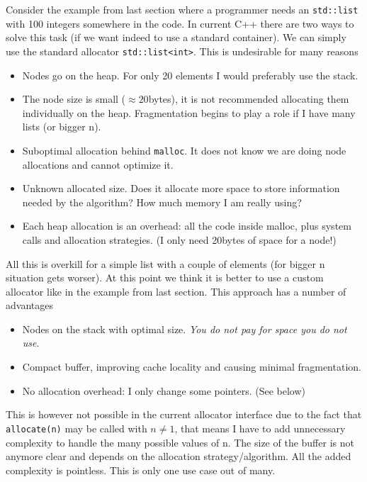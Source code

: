 \documentclass[11pt]{article}
\begin{document}
Consider the example from last section where a programmer needs an
\texttt{std::list} with 100 integers somewhere in the code. In current C++
there are two ways to solve this task (if we want indeed to use a
standard container). We can simply use the standard allocator
\texttt{std::list<int>}.  This is undesirable for many reasons
\begin{itemize}
\item Nodes go on the heap. For only 20 elements I would preferably
use the stack.
\item The node size is small ($\approx 20$bytes), it is not recommended
allocating them individually on the heap. Fragmentation begins to play a role
if I have many lists (or bigger n).
\item Suboptimal allocation behind \texttt{malloc}. It does not
know we are doing node allocations and cannot optimize it.
\item Unknown allocated size. Does it allocate more space to store information
needed by the algorithm? How much memory I am really using?
\item  Each heap allocation is an overhead: all the code inside malloc, plus
system calls and allocation strategies. (I only need 20bytes of space for a
node!)
\end{itemize}

All this is overkill for a simple list with a couple of elements
(for bigger n situation gets worser). At this point we think it is
better to use a custom allocator like in the example from last section.
This approach has a number of advantages
\begin{itemize}
\item Nodes on the stack with optimal size. {\it You do not pay for space you do not use}.
\item Compact buffer, improving cache locality and causing
minimal fragmentation.
\item No allocation overhead: I only change some pointers. (See below)
\end{itemize}

This is however not possible in the current allocator interface
due to the fact that \texttt{allocate(n)} may be called with $n \ne 1$,
that means I have to add unnecessary complexity to handle the many possible
values of n. The size of the buffer is not anymore clear and depends on the
allocation strategy/algorithm. All the added complexity is pointless. This is
only one use case out of many.
\end{document}
